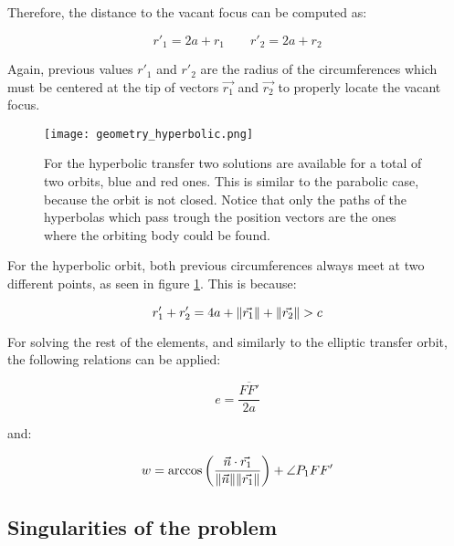 Therefore, the distance to the vacant focus can be computed as:

\begin{equation}
  r'_{1} = 2a + r_{1}\quad\quad
  r'_{2} = 2a + r_{2}
\end{equation}

Again, previous values $r'_{1}$ and $r'_{2}$ are the radius of the
circumferences which must be centered at the tip of vectors $\vec{r_{1}}$ and
$\vec{r_{2}}$ to properly locate the vacant focus.


\vspace{0.15cm}
\begin{figure}[H]
  \centering
  \texttt{[image: geometry\_hyperbolic.png]}
  \caption[Hyperbolic transfer geometry]{For the hyperbolic transfer two solutions are available for a total
    of two orbits, blue and red ones. This is similar to the parabolic case, because the
    orbit is not closed. Notice that only the paths of the hyperbolas which pass trough the
    position vectors are the ones where the orbiting body could be found.
  }
  \label{fig:hyperbolic_geometry}
\end{figure}

For the hyperbolic orbit, both previous circumferences always meet at two
different points, as seen in figure \ref{fig:hyperbolic_geometry}. This is
because:

\begin{equation}
  r'_{1} + r'_{2} = 4a + \lVert\vec{r_{1}}\rVert + \lVert\vec{r_{2}}\rVert > c
\end{equation}

For solving the rest of the elements, and similarly to the elliptic transfer
orbit, the following relations can be applied:

\begin{equation}
  e = \frac{\overline{FF'}}{2a}
  \label{eq:ellipse_ecc}
\end{equation}

and:

\begin{equation}
  w = \arccos{\left(\frac{\vec{n} \cdot \vec{r_{1}}}{\lVert\vec{n}\rVert
      \lVert\vec{r_{1}}\rVert} \right) + \angle P_{1}FF'}
  \label{eq:hyperbola_w}
\end{equation}


\subsection{Singularities of the problem}

